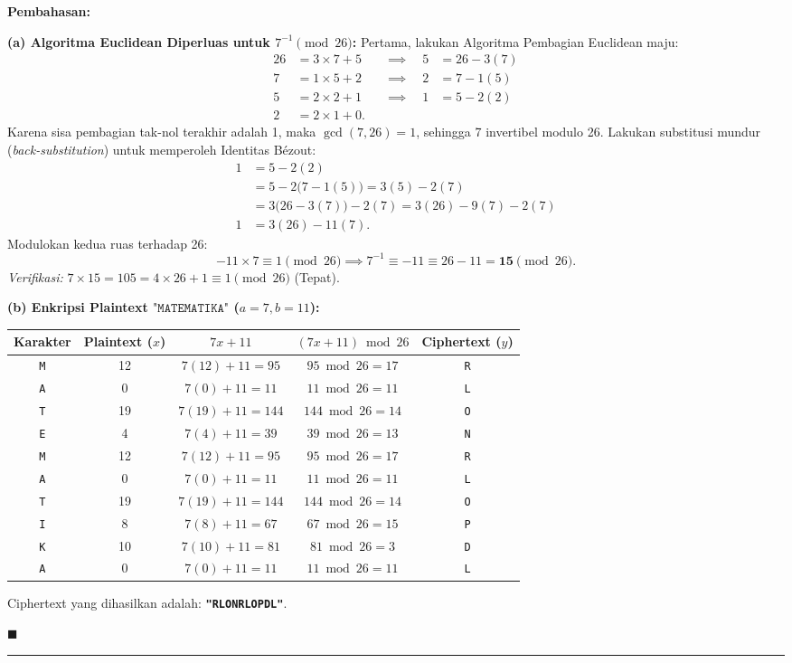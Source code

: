\documentclass[11pt,a4paper]{article}
\newenvironment{solusi}{\noindent\textbf{\textsf{Pembahasan:}}\par\vspace{0.2em}}{\hfill$\blacksquare$\vspace{1em}\par\hrule\vspace{1em}}
\begin{document}
\begin{solusi}
\textbf{(a) Algoritma Euclidean Diperluas untuk $7^{-1} \pmod{26}$:}
Pertama, lakukan Algoritma Pembagian Euclidean maju:
\begin{align*}
26 &= 3 \times 7 + 5 \quad &\implies \quad 5 &= 26 - 3(7) \\
7 &= 1 \times 5 + 2 \quad &\implies \quad 2 &= 7 - 1(5) \\
5 &= 2 \times 2 + 1 \quad &\implies \quad 1 &= 5 - 2(2) \\
2 &= 2 \times 1 + 0.
\end{align*}
Karena sisa pembagian tak-nol terakhir adalah 1, maka $\gcd(7, 26) = 1$, sehingga 7 invertibel modulo 26.
Lakukan substitusi mundur (\textit{back-substitution}) untuk memperoleh Identitas Bézout:
\begin{align*}
1 &= 5 - 2(2) \\
&= 5 - 2\big(7 - 1(5)\big) = 3(5) - 2(7) \\
&= 3\big(26 - 3(7)\big) - 2(7) = 3(26) - 9(7) - 2(7) \\
1 &= 3(26) - 11(7).
\end{align*}
Modulokan kedua ruas terhadap 26:
\[
-11 \times 7 \equiv 1 \pmod{26} \implies 7^{-1} \equiv -11 \equiv 26 - 11 = \mathbf{15} \pmod{26}.
\]
\textit{Verifikasi:} $7 \times 15 = 105 = 4 \times 26 + 1 \equiv 1 \pmod{26}$ (Tepat).

\vspace{0.2cm}
\textbf{(b) Enkripsi Plaintext $\texttt{"MATEMATIKA"}$ ($a=7, b=11$):}
\begin{center}
\begin{tabular}{c c c c c}
\toprule
\textbf{Karakter} & \textbf{Plaintext ($x$)} & $7x + 11$ & $(7x + 11) \bmod 26$ & \textbf{Ciphertext ($y$)} \\
\midrule
\texttt{M} & 12 & $7(12) + 11 = 95$ & $95 \bmod 26 = 17$ & \texttt{R} \\
\texttt{A} & 0  & $7(0) + 11 = 11$  & $11 \bmod 26 = 11$ & \texttt{L} \\
\texttt{T} & 19 & $7(19) + 11 = 144$ & $144 \bmod 26 = 14$ & \texttt{O} \\
\texttt{E} & 4  & $7(4) + 11 = 39$  & $39 \bmod 26 = 13$ & \texttt{N} \\
\texttt{M} & 12 & $7(12) + 11 = 95$ & $95 \bmod 26 = 17$ & \texttt{R} \\
\texttt{A} & 0  & $7(0) + 11 = 11$  & $11 \bmod 26 = 11$ & \texttt{L} \\
\texttt{T} & 19 & $7(19) + 11 = 144$ & $144 \bmod 26 = 14$ & \texttt{O} \\
\texttt{I} & 8  & $7(8) + 11 = 67$  & $67 \bmod 26 = 15$ & \texttt{P} \\
\texttt{K} & 10 & $7(10) + 11 = 81$ & $81 \bmod 26 = 3$  & \texttt{D} \\
\texttt{A} & 0  & $7(0) + 11 = 11$  & $11 \bmod 26 = 11$ & \texttt{L} \\
\bottomrule
\end{tabular}
\end{center}
Ciphertext yang dihasilkan adalah: \textbf{\texttt{"RLONRLOPDL"}}.


\end{solusi}
\end{document}
